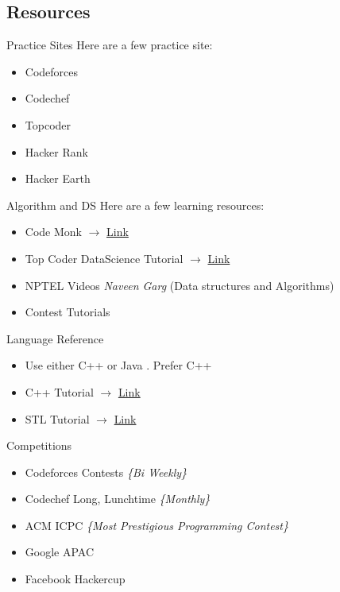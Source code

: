 \documentclass{beamer}
\begin{document}
		\subsection{Resources}
			\begin{frame}{Practice Sites}
				Here are a few practice site:
				\pause
				\begin{itemize}
					\item<+-> Codeforces
					\item<+-> Codechef
					\item<+-> Topcoder
					\item<+-> Hacker Rank
					\item<+-> Hacker Earth
				\end{itemize}
			\end{frame}
			\begin{frame}{Algorithm and DS}
				Here are a few learning resources:
				\pause
				\begin{itemize}
					\item<+-> Code Monk $\rightarrow$ \href{https://www.hackerearth.com/practice/codemonk/}{Link}
					\item<+-> Top Coder DataScience Tutorial $\rightarrow$ \href{https://www.topcoder.com/community/data-science/data-science-tutorials/}{Link}
					\item<+-> NPTEL Videos \textit{Naveen Garg} (Data structures and Algorithms)
					\item<+-> Contest Tutorials
				\end{itemize}
			\end{frame}
			\begin{frame}{Language Reference}
				\begin{itemize}
					\item<+-> Use either C++ or Java . Prefer C++
					\item<+-> C++ Tutorial $\rightarrow$ \href{http://www.learncpp.com/}{Link}
					\item<+-> STL Tutorial $\rightarrow$ \href{https://www.topcoder.com/community/data-science/data-science-tutorials/power-up-c-with-the-standard-template-library-part-1/}{Link}
				\end{itemize}
			\end{frame}
			\begin{frame}{Competitions}
				\begin{itemize}
					\item<+-> Codeforces Contests \textit{\{Bi Weekly\}}
					\item<+-> Codechef Long, Lunchtime  \textit{\{Monthly\}}
					\item<+-> ACM ICPC \textit{\{Most Prestigious Programming Contest\}}
					\item<+-> Google APAC
					\item<+-> Facebook Hackercup
				\end{itemize}
			\end{frame}
\end{document}
